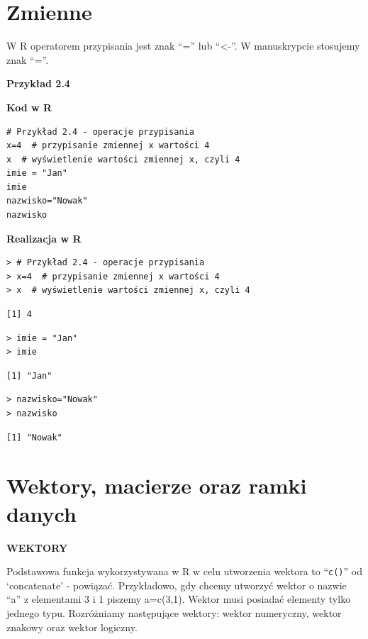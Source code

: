 \documentclass[12pt,B5paper,]{book}
\begin{document}
\section{Zmienne}\label{zmienne}

W R operatorem przypisania jest znak ``='' lub ``\textless{}-''. W
manuskrypcie stosujemy znak ``=''.

\vspace{0.8cm}

\textbf{Przykład 2.4}

\textbf{Kod w R}

\begin{verbatim}
# Przykład 2.4 - operacje przypisania
x=4  # przypisanie zmiennej x wartości 4
x  # wyświetlenie wartości zmiennej x, czyli 4
imie = "Jan"
imie
nazwisko="Nowak"
nazwisko
\end{verbatim}

\textbf{Realizacja w R}

\begin{verbatim}
> # Przykład 2.4 - operacje przypisania
> x=4  # przypisanie zmiennej x wartości 4
> x  # wyświetlenie wartości zmiennej x, czyli 4
\end{verbatim}

\begin{verbatim}
[1] 4
\end{verbatim}

\begin{verbatim}
> imie = "Jan"
> imie
\end{verbatim}

\begin{verbatim}
[1] "Jan"
\end{verbatim}

\begin{verbatim}
> nazwisko="Nowak"
> nazwisko
\end{verbatim}

\begin{verbatim}
[1] "Nowak"
\end{verbatim}

\section{Wektory, macierze oraz ramki
danych}\label{wektory-macierze-oraz-ramki-danych}

\textbf{WEKTORY}

Podstawowa funkcja wykorzystywana w R w celu utworzenia wektora to
``\texttt{c()}'' od `concatenate' - powiązać. Przykładowo, gdy chcemy
utworzyć wektor o nazwie ``a'' z elementami 3 i 1 piszemy a=c(3,1).
Wektor musi posiadać elementy tylko jednego typu. Rozróżniamy
następujące wektory: wektor numeryczny, wektor znakowy oraz wektor
logiczny.
\end{document}
